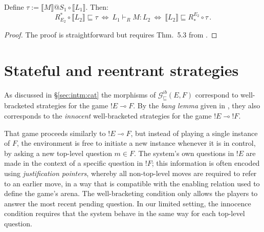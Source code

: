 \documentclass[sigplan,screen]{acmart}
\newcommand{\gcat}{\mathcal{G}_{\sqsubseteq}}
\begin{document}

\begin{lemma}
Define
$\tau := \llbracket M \rrbracket @ S_1 \circ \llbracket L_1 \rrbracket$.
Then:
\[
  R^*_{E_2} \!\circ \llbracket L_2 \rrbracket \sqsubseteq \tau
  \: \Leftrightarrow \:
  L_1 \vdash_R M : L_2
  \: \Leftrightarrow \:
  \llbracket L_2 \rrbracket \sqsubseteq R_*^{E_2} \!\circ \tau \,.
\]
\begin{proof}
The proof is straightforward but requires
Thm.~5.3 from \cite{dndf}.
\end{proof}
\end{lemma}



\section{Stateful and reentrant strategies} \label{sec:gamesem} %


As discussed in \S\ref{sec:intm:cat}
the morphisms of $\gcat^{ib}(E, F)$
correspond to well-bracketed strategies
for the game ${!E} \multimap F$.
By the \emph{bang lemma} given in \cite{gamesem99},
they also corresponds to the
\emph{innocent} well-bracketed strategies
for the game ${!E} \multimap {!F}$.

That game proceeds similarly to ${!E} \multimap F$,
but instead of playing a single instance of $F$,
the environment is free to initiate a new instance
whenever it is in control,
by asking a new top-level question $m \in F$.
The system's own questions in ${!E}$
are made in the context of a specific question in ${!F}$;
this information is often encoded using \emph{justification pointers},
whereby all non-top-level moves are required to refer to
an earlier move,
in a way that is compatible with the enabling relation
used to define the game's arena.
The well-bracketing condition only allows the players
to answer the most recent pending question.
In our limited setting,
the innocence condition requires that the system
behave in the same way for each top-level question.
\end{document}
